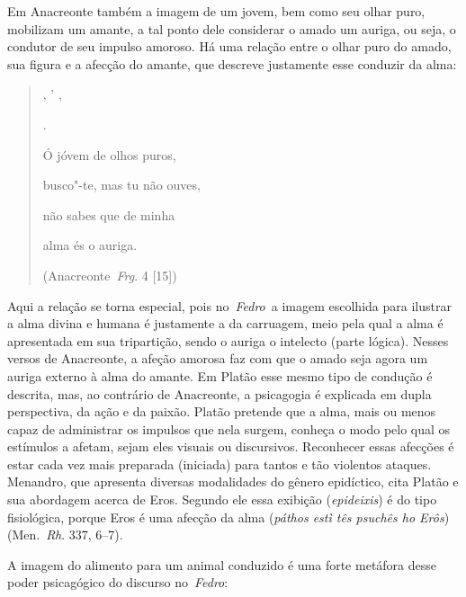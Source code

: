  

 

Em Anacreonte também a imagem de um jovem, bem como seu olhar puro,
mobilizam um amante, a tal ponto dele considerar o amado um auriga, ou
seja, o condutor de seu impulso amoroso. Há uma relação entre o olhar
puro do amado, sua figura e a afecção do amante, que descreve justamente
esse conduzir da alma:

 

\begin{quote}
   

 ,  '  ,

    

 .

 

Ó jóvem de olhos puros,

busco"-te, mas tu não ouves,

não sabes que de minha

alma és o auriga.

 

(Anacreonte~\emph{Frg}. 4 [15])
\end{quote}

 

Aqui a relação se torna especial, pois no~\emph{Fedro}~a imagem
escolhida para ilustrar a alma divina e humana é justamente a da
carruagem, meio pela qual a alma é apresentada em sua tripartição, sendo
o auriga o intelecto (parte lógica). Nesses versos de Anacreonte, a
afeção amorosa faz com que o amado seja agora um auriga externo à alma
do amante. Em Platão esse mesmo tipo de condução é descrita, mas, ao
contrário de Anacreonte, a psicagogia é explicada em dupla perspectiva,
da ação e da paixão. Platão pretende que a alma, mais ou menos capaz de
administrar os impulsos que nela surgem, conheça o modo pelo qual os
estímulos a afetam, sejam eles visuais ou discursivos. Reconhecer essas
afecções é estar cada vez mais preparada (iniciada) para tantos e tão
violentos ataques. Menandro, que apresenta diversas modalidades do
gênero epidíctico, cita Platão e sua abordagem acerca de Eros. Segundo
ele essa exibição (\emph{epideixis}) é do tipo fisiológica, porque Eros
é uma afecção da alma (\emph{páthos estì tês psuchês ho Erôs})
(Men.~\emph{Rh}. 337, 6--7).

A imagem do alimento para um animal conduzido é uma forte metáfora desse
poder psicagógico do discurso no~\emph{Fedro}:

